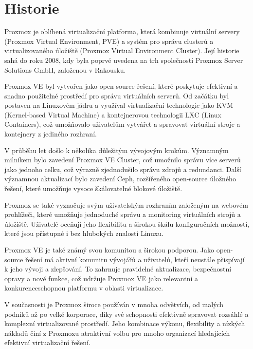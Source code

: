 \chapter{Historie}

Proxmox je oblíbená virtualizační platforma, která kombinuje virtuální servery (Proxmox Virtual Environment, PVE) a systém pro správu clusterů a virtualizovaného úložiště (Proxmox Virtual Environment Cluster). Její historie sahá do roku 2008, kdy byla poprvé uvedena na trh společností Proxmox Server Solutions GmbH, založenou v Rakousku.

Proxmox VE byl vytvořen jako open-source řešení, které poskytuje efektivní a snadno použitelné prostředí pro správu virtuálních serverů. Od začátku byl postaven na Linuxovém jádru a využíval virtualizační technologie jako KVM (Kernel-based Virtual Machine) a kontejnerovou technologii LXC (Linux Containers), což umožňovalo uživatelům vytvářet a spravovat virtuální stroje a kontejnery z jediného rozhraní.

V průběhu let došlo k několika důležitým vývojovým krokům. Významným milníkem bylo zavedení Proxmox VE Cluster, což umožnilo správu více serverů jako jednoho celku, což výrazně zjednodušilo správu zdrojů a redundanci. Další významnou aktualizací bylo zavedení Ceph, rozšířeného open-source úložného řešení, které umožňuje vysoce škálovatelné blokové úložiště.

Proxmox se také vyznačuje svým uživatelským rozhraním založeným na webovém prohlížeči, které umožňuje jednoduché správu a monitoring virtuálních strojů a úložiště. Uživatelé oceňují jeho flexibilitu a širokou škálu konfiguračních možností, které jsou přístupné i bez hlubokých znalostí Linuxu.

Proxmox VE je také známý svou komunitou a širokou podporou. Jako open-source řešení má aktivní komunitu vývojářů a uživatelů, kteří neustále přispívají k jeho vývoji a zlepšování. To zahrnuje pravidelné aktualizace, bezpečnostní opravy a nové funkce, což udržuje Proxmox VE jako relevantní a konkurenceschopnou platformu v oblasti virtualizace.

V současnosti je Proxmox široce používán v mnoha odvětvích, od malých podniků až po velké korporace, díky své schopnosti efektivně spravovat rozsáhlé a komplexní virtualizované prostředí. Jeho kombinace výkonu, flexibility a nízkých nákladů činí z Proxmoxu atraktivní volbu pro mnoho organizací hledajících efektivní virtualizační řešení.